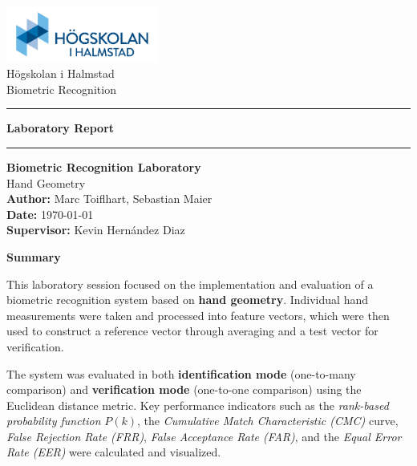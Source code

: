 \documentclass[a4paper,12pt]{article}
\begin{document}
\begin{titlepage}
    \centering
    \includegraphics[width=5cm]{Resources/hogskolan-halmstad-logo.png} \\[0.5cm] %
    Högskolan i Halmstad \\[0.2cm]
    Biometric Recognition \\[1.5cm]
    
    \hrule
    \vspace{0.4cm} %
    {\LARGE \textbf{Laboratory Report}}
    \vspace{0.4cm}
    \hrule
    \vspace{1.5cm} %

    {\Large \textbf{Biometric Recognition Laboratory}} \\[0.2cm]
    {\Large Hand Geometry} \\[1cm]
    
    \textbf{Author:} Marc Toiflhart, Sebastian Maier \\[0.2cm]
    \textbf{Date:} \today \\[0.2cm]
    \textbf{Supervisor:} Kevin Hernández Diaz

    \vfill
\end{titlepage}
\newpage

\begin{center}
    \textbf{Summary}
\end{center}

\noindent
This laboratory session focused on the implementation and evaluation of a biometric recognition system based on \textbf{hand geometry}. Individual hand measurements were taken and processed into feature vectors, which were then used to construct a reference vector through averaging and a test vector for verification.

\vspace{0.3em}
\noindent
The system was evaluated in both \textbf{identification mode} (one-to-many comparison) and \textbf{verification mode} (one-to-one comparison) using the Euclidean distance metric. Key performance indicators such as the \emph{rank-based probability function} $P(k)$, the \emph{Cumulative Match Characteristic (CMC)} curve, \emph{False Rejection Rate (FRR)}, \emph{False Acceptance Rate (FAR)}, and the \emph{Equal Error Rate (EER)} were calculated and visualized.
\end{document}
